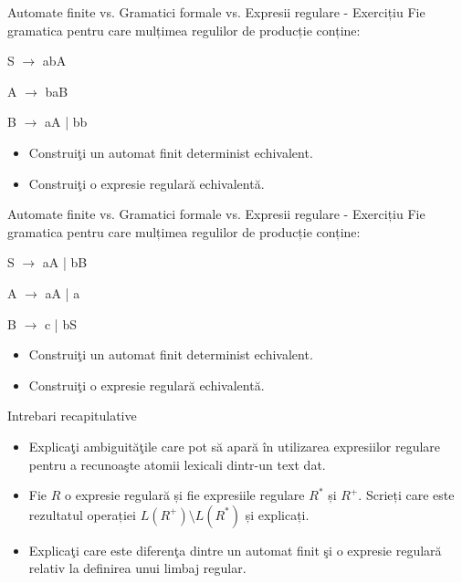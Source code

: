 \documentclass[pdf]{beamer}
\begin{document}
\begin{frame}{Automate finite vs. Gramatici formale vs. Expresii regulare - Exercițiu}
Fie gramatica pentru care mulțimea regulilor de producție conține:

S $\rightarrow$ abA

A $\rightarrow$ baB

B $\rightarrow$ aA | bb

\begin{itemize}
\item
Construiţi un automat finit determinist echivalent.
\item
Construiţi o expresie regulară echivalentă.
\end{itemize}
\end{frame}



\begin{frame}{Automate finite vs. Gramatici formale vs. Expresii regulare - Exercițiu}
Fie gramatica pentru care mulțimea regulilor de producție conține:

S $\rightarrow$ aA | bB

A $\rightarrow$ aA | a

B $\rightarrow$ c | bS

\begin{itemize}
\item
Construiţi un automat finit determinist echivalent.
\item
Construiţi o expresie regulară echivalentă.
\end{itemize}
\end{frame}



\begin{frame}{Intrebari recapitulative}
\begin{itemize}

\item
Explicaţi ambiguităţile care pot să apară în utilizarea expresiilor regulare pentru a recunoaşte atomii lexicali dintr-un text dat.
\newline

\item
Fie $R$ o expresie regulară și fie expresiile regulare $R^*$ și $R^+$. Scrieți care este rezultatul operației $L(R^+)\setminus L(R^*)$ și explicați.
\newline

\item
Explicaţi care este diferenţa dintre un automat finit şi o expresie regulară relativ la definirea unui limbaj regular.
\newline

\end{itemize}
\end{frame}
\end{document}
